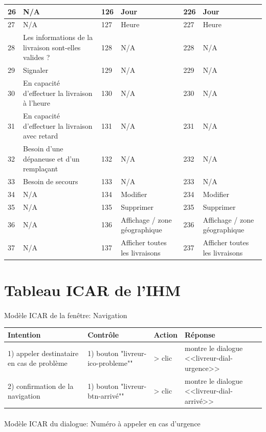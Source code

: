 \documentclass{report}
\begin{document}
\begin{longtable}{|p{0.5cm}|p{3.5cm}|p{0.5cm}|p{3.5cm}|p{0.5cm}|p{3.5cm}|}
26&N/A&126&Jour&226&Jour\\\hline
27&N/A&127&Heure&227&Heure\\\hline
28&Les informations de la livraison sont-elles valides ?&128&N/A&228&N/A\\\hline
29&Signaler&129&N/A&229&N/A\\\hline
30&En capacité d'effectuer la livraison à l'heure&130&N/A&230&N/A\\\hline
31&En capacité d'effectuer la livraison avec retard&131&N/A&231&N/A\\\hline
32&Besoin d'une dépaneuse et d'un remplaçant&132&N/A&232&N/A\\\hline
33&Besoin de secours&133&N/A&233&N/A\\\hline
34&N/A&134&Modifier&234&Modifier\\\hline
35&N/A&135&Supprimer&235&Supprimer\\\hline
36&N/A&136&Affichage / zone géographique&236&Affichage / zone géographique\\\hline
37&N/A&137&Afficher toutes les livraisons&237&Afficher toutes les livraisons\\\hline

\end{longtable}

\newpage

\section{Tableau ICAR de l'IHM}


\paragraph{}
Modèle ICAR de la fenêtre: Navigation

\begin{longtable}{|p{3cm}|p{4cm}|p{2cm}|p{5cm}|}
\hline
Intention&Contrôle&Action&Réponse\\\hline
1) appeler destinataire en cas de problème&1) bouton \newline
"livreur-ico-probleme""&> clic&montre le dialogue <<livreur-dial-urgence>>\\\hline
2) confirmation de la navigation&1) bouton \newline
"livreur-btn-arrivé""&> clic&montre le dialogue <<livreur-dial-arrivé>>\\\hline
\end{longtable}

\paragraph{}
Modèle ICAR du dialogue: Numéro à appeler en cas d'urgence
\end{document}
